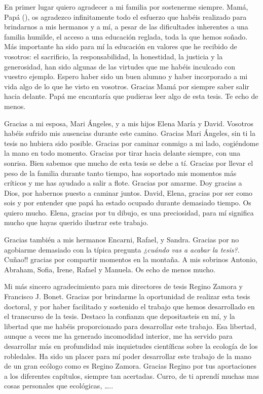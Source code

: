 %
\label{sec:acknowledgement}

\small
En primer lugar quiero agradecer a mi familia por sostenerme siempre. Mamá, Papá (\dag), os agradezco infinitamente todo el esfuerzo que habéis realizado para brindarnos a mis hermanos y a mí, a pesar de las dificultades inherentes a una familia humilde, el acceso a una educación reglada, toda la que hemos soñado. Más importante ha sido para mí la educación en valores que he recibido de vosotros: el sacrificio, la responsabilidad, la honestidad, la justicia y la generosidad, han sido algunas de las virtudes que me habéis inculcado con vuestro ejemplo. Espero haber sido un buen alumno y haber incorporado a mi vida algo de lo que he visto en vosotros. Gracias Mamá por siempre saber salir hacia delante. Papá me encantaría que pudieras leer algo de esta tesis. Te echo de menos. 

Gracias a mi esposa, Mari Ángeles, y a mis hijos Elena María y David. Vosotros habéis sufrido mis ausencias durante este camino. Gracias Mari Ángeles, sin ti la tesis no hubiera sido posible. Gracias por caminar conmigo a mi lado, cogiéndome la mano en todo momento. Gracias por tirar hacia delante siempre, con una sonrisa. Bien sabemos que mucho de esta tesis se debe a tí. Gracias por llevar el peso de la familia durante tanto tiempo, has soportado mis momentos más críticos y me has ayudado a salir a flote. Gracias por amarme. Doy gracias a Dios, por habernos puesto a caminar juntos. David, Elena, gracias por ser como sois y por entender que papá ha estado ocupado durante demasiado tiempo. Os quiero mucho. Elena, gracias por tu dibujo, es una preciosidad, para mí significa mucho que hayas querido ilustrar este trabajo.

Gracias también a mis hermanos Encarni, Rafael, y Sandra. Gracias por no agobiarme demasiado con la típica pregunta \emph{¿cuándo vas a acabar la tesis?}. Cuñao!! gracias por compartir momentos en la montaña. A mis sobrinos Antonio, Abraham, Sofia, Irene, Rafael y Manuela. Os echo de menos mucho. 

Mi más sincero agradecimiento para mis directores de tesis Regino Zamora y Francisco J. Bonet. Gracias por brindarme la oportunidad de realizar esta tesis doctoral, y por haber facilitado y sostenido el trabajo que hemos desarrollado en el transcurso de la tesis. Destaco la confianza que depositasteis en mí, y la libertad que me habéis proporcionado para desarrollar este trabajo. Esa libertad, aunque a veces me ha generado incomodidad interior, me ha servido para desarrollar más en profundidad mis inquietudes científicas sobre la ecología de los robledales. Ha sido un placer para mí poder desarrollar este trabajo de la mano de un gran ecólogo como es Regino Zamora. Gracias Regino por tus aportaciones a los diferentes capítulos, siempre tan acertadas. Curro, de ti aprendí muchas mas cosas personales que ecológicas,  ….. 

